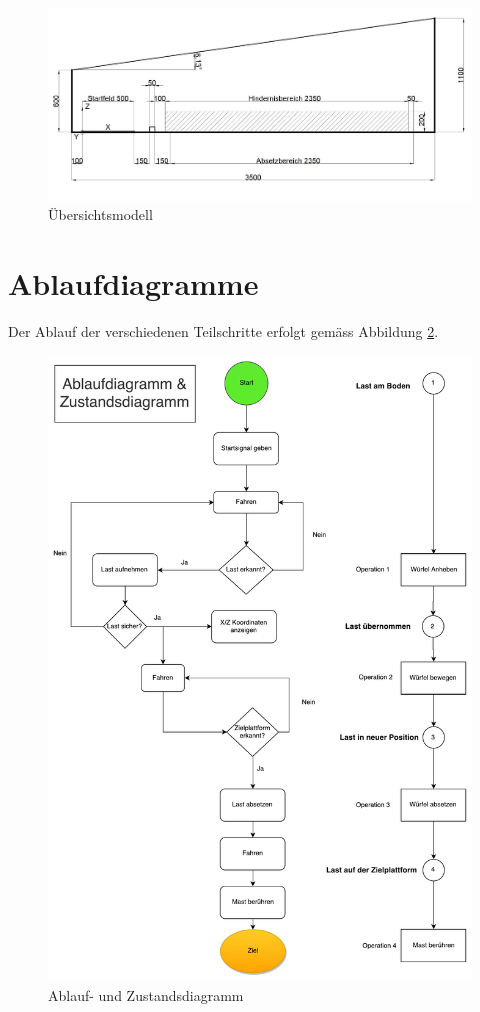 \documentclass[a4paper]{report}
\begin{document}
\begin{figure}[h!]
	\includegraphics[keepaspectratio,width=\textwidth]{PrenFunktionsskizze}
	\caption{Übersichtsmodell}
	\label{fig:Funktionsskizze}
\end{figure}

\newpage
\section{Ablaufdiagramme}
\label{sec:Ablaufdiagramme}
Der Ablauf der verschiedenen Teilschritte erfolgt gemäss Abbildung \ref{fig:Ablaufdiagramm}.

\begin{figure}[h!]
	\includegraphics[keepaspectratio,width=\textwidth]{Ablaufdiagramm}
	\caption{Ablauf- und Zustandsdiagramm}
	\label{fig:Ablaufdiagramm}
\end{figure}
\end{document}
